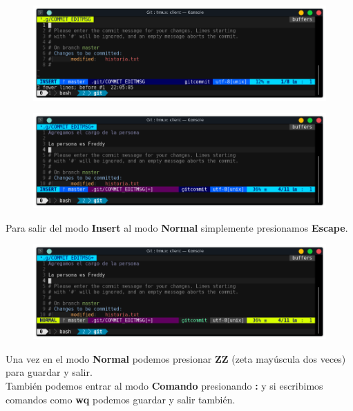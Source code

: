 \documentclass{article}
\begin{document}
\begin{figure}[h!]
  \centering
  \includegraphics[scale=0.75]{./Pictures/093_mod_insert.png}
\end{figure}

\newpage

\begin{figure}[h!]
  \centering
  \includegraphics[scale=0.75]{./Pictures/094_mod_insert.png}
\end{figure}

Para salir del modo \textbf{Insert} al modo \textbf{Normal} simplemente
presionamos \textbf{Escape}.\\

\begin{figure}[h!]
  \centering
  \includegraphics[scale=0.75]{./Pictures/095_mod_normal.png}
\end{figure}

Una vez en el modo \textbf{Normal} podemos presionar \textbf{ZZ} (zeta
mayúscula dos veces) para guardar y salir.\\

También podemos entrar al modo \textbf{Comando} presionando \textbf{:} y si
escribimos comandos como \textbf{wq} podemos guardar y salir también.
\end{document}

